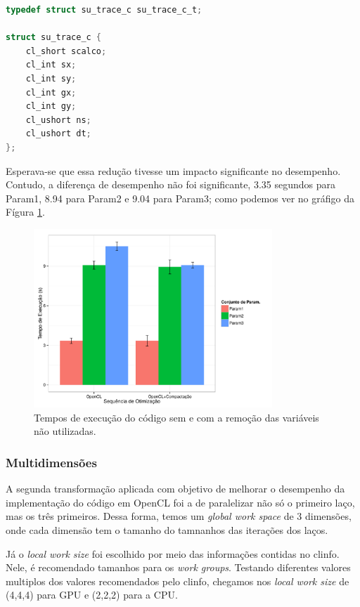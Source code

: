\documentclass[12pt]{article}
\begin{document}
\begin{lstlisting}[language=c, caption=Estrutura su\_trace depois de compactada., label=cstruct]
typedef struct su_trace_c su_trace_c_t;

struct su_trace_c {
	cl_short scalco; 
	cl_int sx; 
	cl_int sy; 
	cl_int gx; 
	cl_int gy; 
	cl_ushort ns; 
	cl_ushort dt; 
};
\end{lstlisting}


Esperava-se que essa redução tivesse um impacto significante no desempenho. Contudo, a diferença de desempenho não foi significante, 3.35 segundos para Param1, 8.94 para Param2 e 9.04 para Param3; como podemos ver no gráfigo da Fígura \ref{fgcstruct}. 

\begin{figure}[H]
\centering
\includegraphics[width=0.8\textwidth]{oclcstruct.pdf}
\caption{Tempos de execução do código sem e com a remoção das variáveis não utilizadas.}
\label{fgcstruct}
\end{figure}
	

\subsubsection{Multidimensões} \label{multi} 

A segunda transformação aplicada com objetivo de melhorar o desempenho da implementação do código em OpenCL foi a de paralelizar não só o primeiro laço, mas os três primeiros. Dessa forma, temos um \textit{global work space} de 3 dimensões, onde cada dimensão tem o tamanho do tamnanhos das iterações dos laços.

Já o \textit{local work size} foi escolhido por meio das informações contidas no clinfo. Nele, é recomendado tamanhos para os \textit{work groups}. Testando diferentes valores multiplos dos valores recomendados pelo clinfo, chegamos nos \textit{local work size} de (4,4,4) para GPU e (2,2,2) para a CPU.
\end{document}
